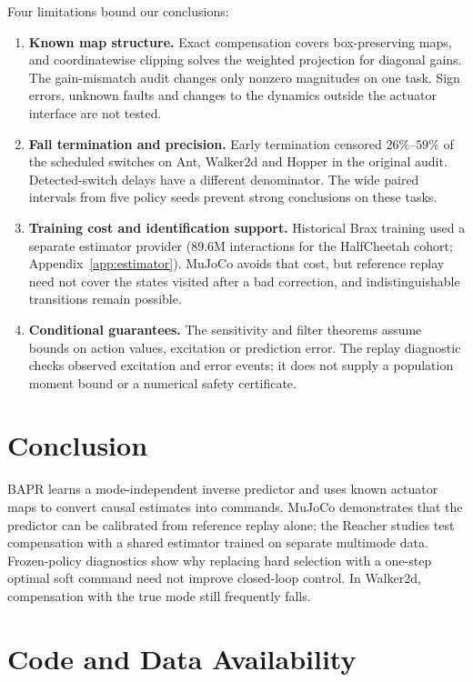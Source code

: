\documentclass[twoside,11pt]{article}
\begin{document}
Four limitations bound our conclusions:
\begin{enumerate}[leftmargin=*]
    \item \textbf{Known map structure.} Exact compensation covers box-preserving maps, and coordinatewise clipping solves the weighted projection for diagonal gains. The gain-mismatch audit changes only nonzero magnitudes on one task. Sign errors, unknown faults and changes to the dynamics outside the actuator interface are not tested.
    \item \textbf{Fall termination and precision.} Early termination censored $26\%$--$59\%$ of the scheduled switches on Ant, Walker2d and Hopper in the original audit. Detected-switch delays have a different denominator. The wide paired intervals from five policy seeds prevent strong conclusions on these tasks.
    \item \textbf{Training cost and identification support.} Historical Brax training used a separate estimator provider (89.6M interactions for the HalfCheetah cohort; Appendix~\ref{app:estimator}). MuJoCo avoids that cost, but reference replay need not cover the states visited after a bad correction, and indistinguishable transitions remain possible.
    \item \textbf{Conditional guarantees.} The sensitivity and filter theorems assume bounds on action values, excitation or prediction error. The replay diagnostic checks observed excitation and error events; it does not supply a population moment bound or a numerical safety certificate.
\end{enumerate}

\section{Conclusion}

BAPR learns a mode-independent inverse predictor and uses known actuator maps to convert causal estimates into commands. MuJoCo demonstrates that the predictor can be calibrated from reference replay alone; the Reacher studies test compensation with a shared estimator trained on separate multimode data. Frozen-policy diagnostics show why replacing hard selection with a one-step optimal soft command need not improve closed-loop control. In Walker2d, compensation with the true mode still frequently falls.

\section*{Code and Data Availability}
\end{document}
